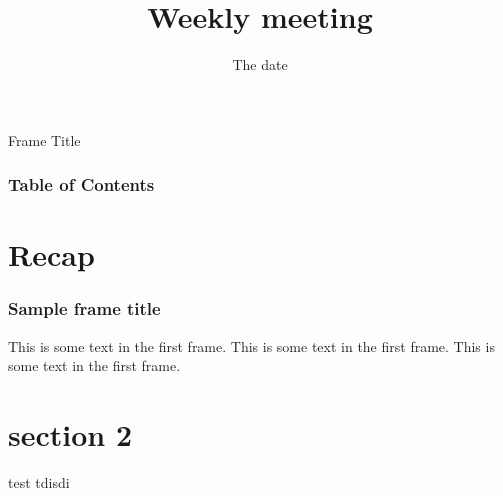 \documentclass{beamer}
\title{Weekly meeting}
\date{The date}
\begin{document}
\frame{\titlepage}

\begin{frame}{Frame Title}
\frametitle{Table of Contents}
\tableofcontents
\end{frame}


\section{Recap}
\begin{frame}
\frametitle{Sample frame title}
This is some text in the first frame. This is some text in the first frame. This is some text in the first frame.
\end{frame}

\section{section 2}
\begin{frame}{test}
    tdisdi
\end{frame}
\end{document}

